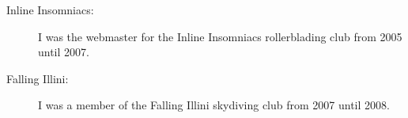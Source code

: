 \documentclass[letterpaper,10pt]{article}
\begin{document}
\begin{description}
\item[Inline Insomniacs:] I was the webmaster for the Inline Insomniacs rollerblading club from 2005 until 2007.
\item[Falling Illini:] I was a member of the Falling Illini skydiving club from 2007 until 2008.
\end{description}
\end{document}
